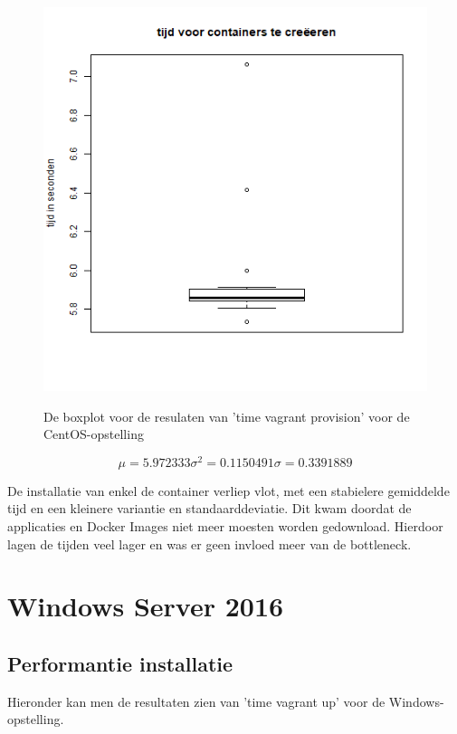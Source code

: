 \begin{figure}
	\centering
	\caption{De boxplot voor de resulaten van 'time vagrant provision' voor de CentOS-opstelling}
	\includegraphics[scale=0.5]{img/centosboxplotprovision.png}
	\label{fig:centosprovisionboxplot}
\end{figure}

\[\mu = 5.972333 \sigma^2 = 0.1150491 \sigma = 0.3391889\]

De installatie van enkel de container verliep vlot, met een stabielere gemiddelde tijd en een kleinere variantie en standaarddeviatie. Dit kwam doordat de applicaties en Docker Images niet meer moesten worden gedownload. Hierdoor lagen de tijden veel lager en was er geen invloed meer van de bottleneck.

\section{Windows Server 2016}
\subsection{Performantie installatie}
Hieronder kan men de resultaten zien van 'time vagrant up' voor de Windows-opstelling.

